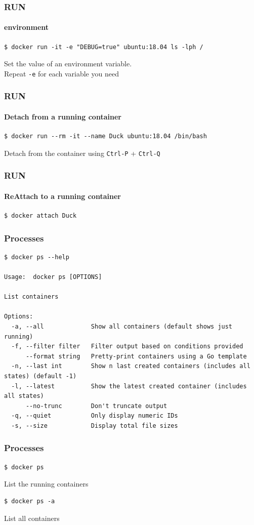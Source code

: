 \begin{frame}[fragile]
\frametitle{RUN}
\framesubtitle{environment}
\begin{lstlisting}
$ docker run -it -e "DEBUG=true" ubuntu:18.04 ls -lph /
\end{lstlisting}
Set the value of an environment variable.\\
\vspace{0.4cm}
Repeat \lstinline!-e! for each variable you need
\end{frame}

\begin{frame}[fragile]
\frametitle{RUN}
\framesubtitle{Detach from a running container}
\begin{lstlisting}
$ docker run --rm -it --name Duck ubuntu:18.04 /bin/bash
\end{lstlisting}
Detach from the container using \lstinline!Ctrl-P! + \lstinline!Ctrl-Q!
\end{frame}

\begin{frame}[fragile]
\frametitle{RUN}
\framesubtitle{ReAttach to a running container}
\begin{lstlisting}
$ docker attach Duck
\end{lstlisting}
\end{frame}

\begin{frame}[fragile]
\frametitle{Processes}
\scriptsize
\begin{lstlisting}[breaklines=true]
$ docker ps --help

Usage:  docker ps [OPTIONS]

List containers

Options:
  -a, --all             Show all containers (default shows just running)
  -f, --filter filter   Filter output based on conditions provided
      --format string   Pretty-print containers using a Go template
  -n, --last int        Show n last created containers (includes all states) (default -1)
  -l, --latest          Show the latest created container (includes all states)
      --no-trunc        Don't truncate output
  -q, --quiet           Only display numeric IDs
  -s, --size            Display total file sizes
\end{lstlisting}
\normalsize
\end{frame}

\begin{frame}[fragile]
\frametitle{Processes}
\begin{lstlisting}
$ docker ps
\end{lstlisting}
List the running containers 
\begin{lstlisting}
$ docker ps -a
\end{lstlisting}
List all containers 
\end{frame}


